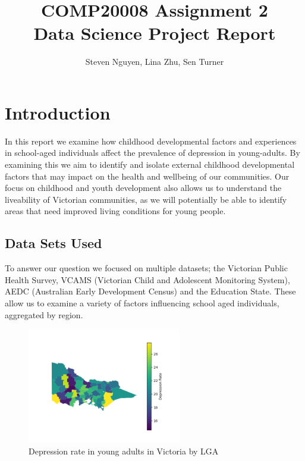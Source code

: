 \documentclass[a4, 11pt]{article}
\title{%
  COMP20008 Assignment 2 \\
  \large Data Science Project Report\\
  }
\author{Steven Nguyen, Lina Zhu, Sen Turner}
\date{}
\begin{document}
\maketitle
\section{Introduction}

In this report we examine how childhood developmental factors and experiences in school-aged individuals affect the prevalence of depression in young-adults. By examining this we aim to identify and isolate external childhood developmental factors that may impact on the health and wellbeing of our communities. Our focus on childhood and youth development also allows us to understand the liveability of Victorian communities, as we will potentially be able to identify areas that need improved living conditions for young people.

\subsection{Data Sets Used}

To answer our question we focused on multiple datasets; the Victorian Public Health Survey, VCAMS (Victorian Child and Adolescent Monitoring System), AEDC (Australian Early Development Census) and the Education State. These allow us to examine a variety of factors influencing school aged individuals, aggregated by region. 

\begin{figure}[h]
    \centering
    \includegraphics[width=0.6\textwidth]{./plots/depressionMap.png}
    \caption{Depression rate in young adults in Victoria by LGA}
    \label{fig:my_label}
\end{figure}
\end{document}
